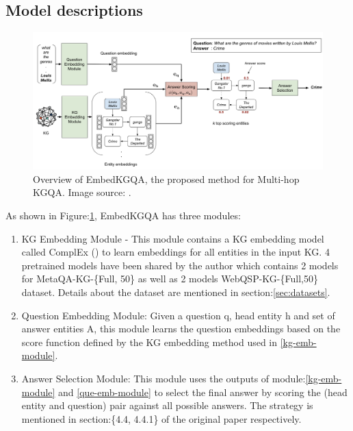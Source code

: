 \subsection{Model descriptions}

\begin{figure}
  \centering
  \includegraphics[width=\textwidth]{../openreview/model.png}
  \caption{Overview of EmbedKGQA, the  proposed method for Multi-hop KGQA. \newline \centering Image source:  \citep{saxena-etal-2020-improving}.
}
  \label{model-figure}
\end{figure}


As shown in Figure:\ref{model-figure}, 
EmbedKGQA has three modules: 
\begin{enumerate}
    \item KG Embedding Module\label{kg-emb-module} - This module contains a KG embedding model called ComplEx (\citep{ComplEx2016}) to learn embeddings for all entities in the input KG. 4 pretrained models have been shared by the author which contains 2 models for MetaQA-KG-\{Full, 50\} as well as 2 models WebQSP-KG-\{Full,50\} dataset. Details about the dataset are mentioned in section:\ref{sec:datasets}.
\item Question Embedding Module\label{que-emb-module}: Given a question q, head entity h and set
of answer entities A, this module learns the question
embeddings based on the score function defined by the KG embedding method used in \ref{kg-emb-module}. 
\item Answer Selection Module: This module uses the outputs of module:\ref{kg-emb-module} and \ref{que-emb-module} to select the final answer by scoring the (head entity and question)
pair against all possible answers. The strategy is mentioned in section:\{4.4, 4.4.1\} of the original paper respectively.
\end{enumerate}

